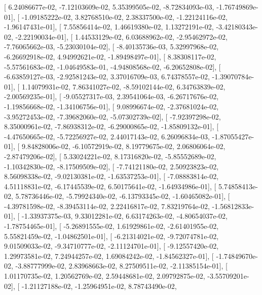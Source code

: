 \documentclass{article}
\begin{document}
       [  6.24086677e-02,  -7.12103609e-02,   5.35399505e-02,
         -8.72834093e-03,  -1.76749869e-01],
       [ -1.09185222e-02,   3.82768510e-02,   2.38337500e-02,
         -1.22124116e-02,  -1.96147431e-01],
       [  7.55856414e-02,   1.46619380e-02,   1.13272191e-02,
         -3.42180343e-02,  -2.22190034e-01],
       [  1.44533129e-02,   6.03688962e-02,  -2.95462972e-02,
         -7.76065662e-03,  -5.23030104e-02],
       [ -8.40135736e-03,   5.32997968e-02,  -6.26692918e-02,
          4.94992621e-02,  -1.89498497e-01],
       [  8.38308117e-02,  -5.57561683e-02,  -1.04649583e-01,
         -4.94808568e-02,  -6.20652808e-02],
       [ -6.63859127e-03,  -2.92581243e-02,   3.37016709e-03,
          6.74378557e-02,  -1.39070784e-01],
       [  1.14079931e-02,   7.86341027e-02,  -8.59102144e-02,
          6.34763839e-02,  -2.00569235e-01],
       [ -9.05527317e-03,   2.39541064e-03,  -6.26717676e-02,
         -1.19856668e-02,  -1.34106756e-01],
       [  9.08996674e-02,  -2.37681024e-02,  -3.95272453e-02,
         -7.39682060e-02,  -5.07302739e-02],
       [ -7.92397298e-02,   8.35000961e-02,  -7.86938312e-02,
         -6.29000865e-02,  -1.85809132e-01],
       [ -4.47650665e-02,  -5.72256927e-02,   2.44017143e-02,
          6.26096834e-03,  -1.87055427e-01],
       [  9.84828006e-02,  -6.10572919e-02,   8.19779675e-02,
          2.06806064e-02,  -2.87479206e-02],
       [  5.33024221e-02,   8.17316820e-02,  -5.85552689e-02,
         -1.10342830e-02,  -8.17509509e-02],
       [ -7.74121180e-02,   2.50923823e-02,   8.56098338e-02,
         -9.02130381e-02,  -1.63537253e-01],
       [ -7.08883814e-02,   4.51118831e-02,  -6.17445539e-02,
          6.50175641e-02,  -1.64934986e-01],
       [  5.74858413e-02,   5.78736446e-02,  -5.79924340e-02,
         -6.13793345e-02,  -1.60465082e-01],
       [ -4.39781598e-02,  -8.39453114e-02,   2.22416817e-02,
          7.83219764e-02,  -1.56812833e-01],
       [ -1.33937375e-03,   9.33012281e-02,   6.63174263e-02,
         -4.80654037e-02,  -1.78754465e-01],
       [ -5.26891555e-02,   1.61929861e-02,  -2.61401955e-02,
          5.55821459e-02,  -1.04862501e-01],
       [ -6.21314021e-02,  -9.72074781e-02,   9.01509033e-02,
         -9.34710777e-02,  -2.11124701e-01],
       [ -9.12557420e-02,   1.29973581e-02,   7.24944257e-02,
          1.69084242e-02,  -1.84562327e-01],
       [ -1.74849670e-02,  -3.88777999e-02,   2.83968663e-02,
          8.27509511e-02,  -2.11385154e-01],
       [  1.01170735e-02,   1.20562769e-02,   2.59448681e-02,
          2.09792875e-02,  -3.55709201e-02],
       [ -1.21127188e-02,  -1.25964951e-02,   8.78743490e-02,
\end{document}

